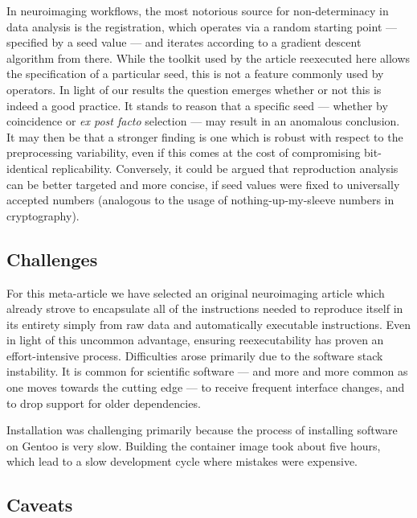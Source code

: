 In neuroimaging workflows, the most notorious source for non-determinacy in data analysis is the registration, which operates via a random starting point — specified by a seed value — and iterates according to a gradient descent algorithm from there.
While the toolkit used by the article reexecuted here allows the specification of a particular seed, this is not a feature commonly used by operators.
In light of our results the question emerges whether or not this is indeed a good practice.
It stands to reason that a specific seed — whether by coincidence or \textit{ex post facto} selection — may result in an anomalous conclusion.
It may then be that a stronger finding is one which is robust with respect to the preprocessing variability, even if this comes at the cost of compromising bit-identical replicability.
Conversely, it could be argued that reproduction analysis can be better targeted and more concise, if seed values were fixed to universally accepted numbers (analogous to the usage of nothing-up-my-sleeve numbers in cryptography).

\subsection{Challenges}
For this meta-article we have selected an original neuroimaging article which already strove to encapsulate all of the instructions needed to reproduce itself in its entirety simply from raw data and automatically executable instructions.
Even in light of this uncommon advantage, ensuring reexecutability has proven an effort-intensive process.
Difficulties arose primarily due to the software stack instability.
It is common for scientific software — and more and more common as one moves towards the cutting edge — to receive frequent interface changes, and to drop support for older dependencies.


Installation was challenging primarily because the process of installing
software on Gentoo is very slow. Building the container image took
about five hours, which lead to a slow development cycle where mistakes
were expensive.

\subsection{Caveats}



